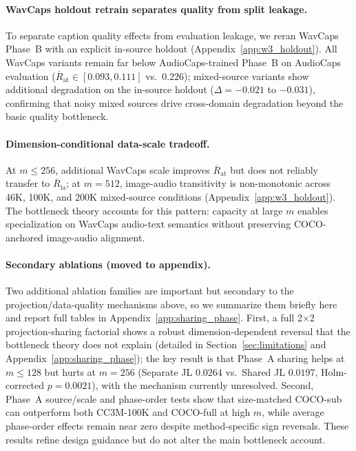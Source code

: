 \documentclass{article}
\newcommand{\avgR}{\overline{R}}
\begin{document}
\paragraph{WavCaps holdout retrain separates quality from split leakage.}
To separate caption quality effects from evaluation leakage, we reran WavCaps Phase~B with an explicit in-source holdout (Appendix~\ref{app:w3_holdout}).
All WavCaps variants remain far below AudioCaps-trained Phase~B on AudioCaps evaluation ($\avgR_\mathrm{at}\in[0.093, 0.111]$ vs.\ $0.226$); mixed-source variants show additional degradation on the in-source holdout ($\Delta=-0.021$ to $-0.031$), confirming that noisy mixed sources drive cross-domain degradation beyond the basic quality bottleneck.

\paragraph{Dimension-conditional data-scale tradeoff.}
At $m\le256$, additional WavCaps scale improves $\avgR_\mathrm{at}$ but does not reliably transfer to $\avgR_\mathrm{ia}$; at $m=512$, image-audio transitivity is non-monotonic across 46K, 100K, and 200K mixed-source conditions (Appendix~\ref{app:w3_holdout}).
The bottleneck theory accounts for this pattern: capacity at large $m$ enables specialization on WavCaps audio-text semantics without preserving COCO-anchored image-audio alignment.

\paragraph{Secondary ablations (moved to appendix).}
Two additional ablation families are important but secondary to the projection/data-quality mechanisms above, so we summarize them briefly here and report full tables in Appendix~\ref{app:sharing_phase}. First, a full 2$\times$2 projection-sharing factorial shows a robust dimension-dependent reversal that the bottleneck theory does not explain (detailed in Section~\ref{sec:limitations} and Appendix~\ref{app:sharing_phase}); the key result is that Phase~A sharing helps at $m\le128$ but hurts at $m=256$ (Separate JL $0.0264$ vs.\ Shared JL $0.0197$, Holm-corrected $p=0.0021$), with the mechanism currently unresolved. Second, Phase~A source/scale and phase-order tests show that size-matched COCO-sub can outperform both CC3M-100K and COCO-full at high $m$, while average phase-order effects remain near zero despite method-specific sign reversals. These results refine design guidance but do not alter the main bottleneck account.
\end{document}
